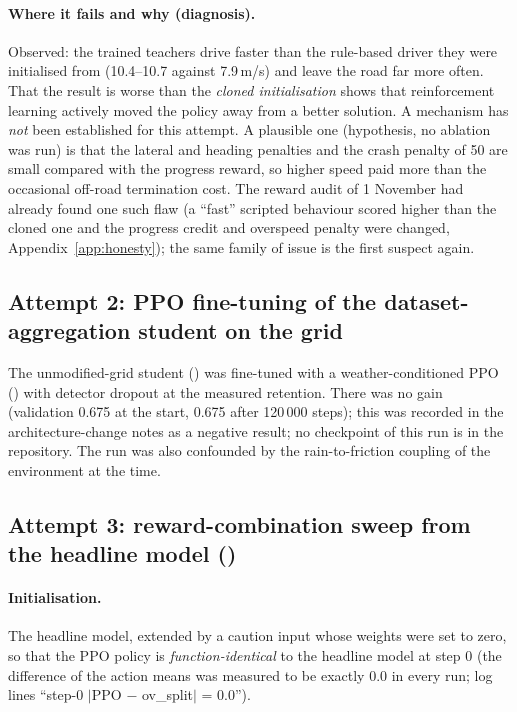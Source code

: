 \paragraph{Where it fails and why (diagnosis).} Observed: the trained teachers drive faster than the rule-based driver they were initialised from (10.4--10.7 against 7.9\,m/s) and leave the road far more often. That the result is worse than the \emph{cloned initialisation} shows that reinforcement learning actively moved the policy away from a better solution.
A mechanism has \emph{not} been established for this attempt. A plausible one (hypothesis, no ablation was run) is that the lateral and heading penalties and the crash penalty of 50 are small compared with the progress reward, so higher speed paid more than the occasional off-road termination cost. The reward audit of 1 November had already found one such flaw (a ``fast'' scripted behaviour scored higher than the cloned one and the progress credit and overspeed penalty were changed, Appendix~\ref{app:honesty}); the same family of issue is the first suspect again.

\subsection{Attempt 2: PPO fine-tuning of the dataset-aggregation student on the grid}
The unmodified-grid student () was fine-tuned with a weather-conditioned PPO () with detector dropout at the measured retention. There was no gain (validation 0.675 at the start, 0.675 after 120\,000 steps); this was recorded in the architecture-change notes as a negative result; no checkpoint of this run is in the repository.
The run was also confounded by the rain-to-friction coupling of the environment at the time.

\subsection{Attempt 3: reward-combination sweep from the headline model ()}
\paragraph{Initialisation.} The headline model, extended by a caution input whose weights were set to zero, so that the PPO policy is \emph{function-identical} to the headline model at step 0 (the difference of the action means was measured to be exactly 0.0 in every run; log lines ``step-0 $|$PPO $-$ ov\_split$|$ = 0.0'').
